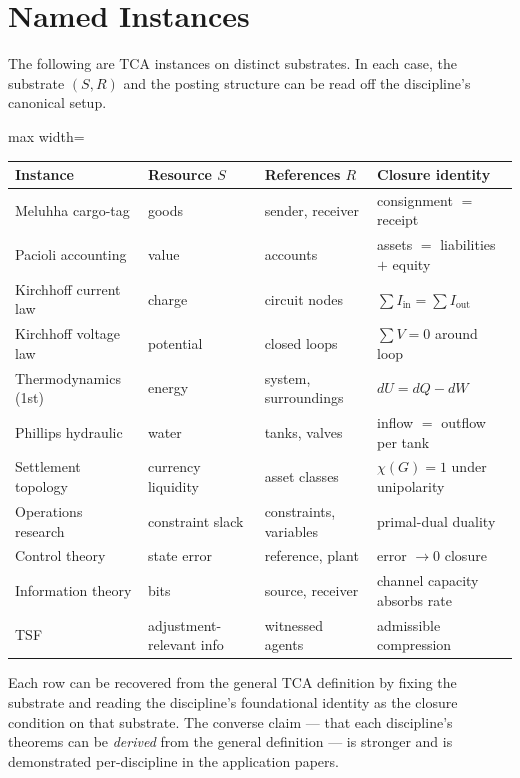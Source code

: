 \documentclass[11pt]{article}
\begin{document}
\section{Named Instances}

The following are TCA instances on distinct substrates. In each case, the substrate $(S, R)$ and the posting structure can be read off the discipline's canonical setup.

\begin{adjustbox}{max width=\textwidth}
\begin{tabular}{@{}llll@{}}
\toprule
\textbf{Instance} & \textbf{Resource $S$} & \textbf{References $R$} & \textbf{Closure identity} \\
\midrule
Meluhha cargo-tag & goods & sender, receiver & consignment $=$ receipt \\
Pacioli accounting & value & accounts & assets $=$ liabilities $+$ equity \\
Kirchhoff current law & charge & circuit nodes & $\sum I_{\text{in}} = \sum I_{\text{out}}$ \\
Kirchhoff voltage law & potential & closed loops & $\sum V = 0$ around loop \\
Thermodynamics (1st) & energy & system, surroundings & $dU = dQ - dW$ \\
Phillips hydraulic & water & tanks, valves & inflow $=$ outflow per tank \\
Settlement topology & currency liquidity & asset classes & $\chi(G) = 1$ under unipolarity \\
Operations research & constraint slack & constraints, variables & primal-dual duality \\
Control theory & state error & reference, plant & error $\to 0$ closure \\
Information theory & bits & source, receiver & channel capacity absorbs rate \\
TSF & adjustment-relevant info & witnessed agents & admissible compression \\
\bottomrule
\end{tabular}
\end{adjustbox}

\bigskip

Each row can be recovered from the general TCA definition by fixing the substrate and reading the discipline's foundational identity as the closure condition on that substrate. The converse claim — that each discipline's theorems can be \emph{derived} from the general definition — is stronger and is demonstrated per-discipline in the application papers.
\end{document}
